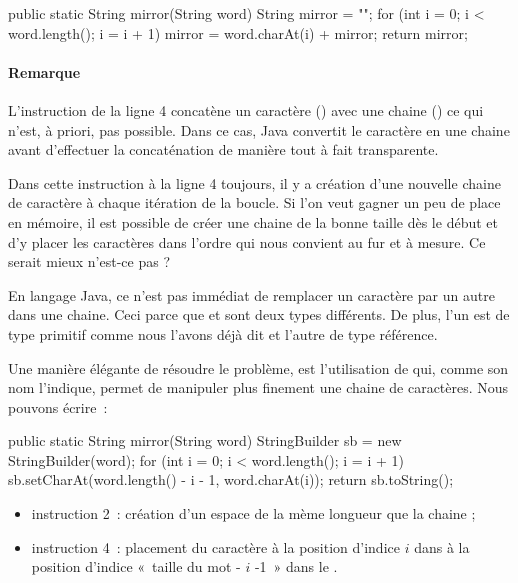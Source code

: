 	\begin{java}
public static String mirror(String word){
	String mirror = "";
	for (int i = 0; i < word.length(); i = i + 1){
		mirror = word.charAt(i) + mirror;
	}
	return mirror;
}
	\end{java}

	\paragraph{Remarque}

	L'instruction de la ligne 4 concatène un caractère ()
	avec une chaine () ce qui n'est, à priori, pas possible. Dans ce
	cas, Java convertit le caractère en une chaine avant d'effectuer la
	concaténation de manière tout à fait transparente. 

	Dans cette instruction à la ligne 4 toujours, il y a création d'une nouvelle
	chaine de caractère à chaque itération de la boucle. Si l'on veut gagner un
	peu de place en mémoire, il est possible de créer une chaine de la bonne
	taille dès le début et d'y placer les caractères dans l'ordre qui nous
	convient au fur et à mesure. Ce serait mieux n'est-ce pas ? 
	
	En langage Java, ce n'est pas immédiat de remplacer un caractère par un
	autre dans une chaine. Ceci parce que  et  sont
	deux types différents. De plus, l'un est de type primitif comme nous l'avons
	déjà dit et l'autre de type référence. 

	Une manière élégante de résoudre le problème, est l'utilisation de
	 qui, comme son nom l'indique, permet de manipuler plus
	finement une chaine de caractères.  Nous pouvons écrire~:

	\begin{java}
public static String mirror(String word){
	StringBuilder sb = new StringBuilder(word);
	for (int i = 0; i < word.length(); i = i + 1){
		sb.setCharAt(word.length() - i - 1, word.charAt(i));
	}
	return sb.toString();
}
	\end{java}

	\begin{itemize}
		\item instruction 2~: création d'un espace de la mème longueur que la 
			chaine ;

		\item instruction 4~: placement du caractère à la position d'indice $i$
			dans  à la position d'indice «~taille du mot - $i$ -1~»
			dans le .

	\end{itemize}
	

